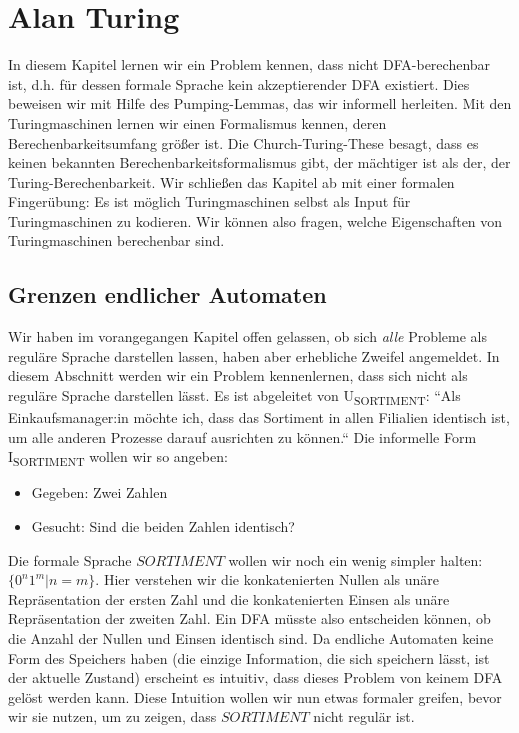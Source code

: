 \chapter{Alan Turing}\label{turing}

In diesem Kapitel lernen wir ein Problem kennen,
dass nicht DFA-berechenbar ist,
d.h. für dessen formale Sprache kein akzeptierender DFA existiert.
Dies beweisen wir mit Hilfe des Pumping-Lemmas,
das wir informell herleiten.
Mit den Turingmaschinen lernen wir einen Formalismus kennen,
deren Berechenbarkeitsumfang größer ist.
Die Church-Turing-These besagt,
dass es keinen bekannten Berechenbarkeitsformalismus gibt,
der mächtiger ist als der, der Turing-Berechenbarkeit.
Wir schließen das Kapitel ab mit einer formalen Fingerübung:
Es ist möglich Turingmaschinen selbst als Input für Turingmaschinen zu kodieren.
Wir können also fragen, welche Eigenschaften von Turingmaschinen berechenbar sind.

\section{Grenzen endlicher Automaten}\label{pumping}
Wir haben im vorangegangen Kapitel offen gelassen,
ob sich \emph{alle} Probleme als reguläre Sprache darstellen lassen,
haben aber erhebliche Zweifel angemeldet.
In diesem Abschnitt werden wir ein Problem kennenlernen,
dass sich nicht als reguläre Sprache darstellen lässt.
Es ist abgeleitet von U\textsubscript{SORTIMENT}:
``Als Einkaufsmanager:in möchte ich,
dass das Sortiment in allen Filialien identisch ist,
um alle anderen Prozesse darauf ausrichten zu können.``
Die informelle Form
I\textsubscript{SORTIMENT}
wollen wir so angeben:
\begin{itemize}
    \item Gegeben: Zwei Zahlen
    \item Gesucht: Sind die beiden Zahlen identisch?
\end{itemize}
Die formale Sprache $SORTIMENT$ wollen wir noch ein wenig simpler halten:
$\{0^n1^m|n=m\}$.
Hier verstehen wir die konkatenierten Nullen als unäre Repräsentation der ersten Zahl
und die konkatenierten Einsen als unäre Repräsentation der zweiten Zahl.
Ein DFA müsste also entscheiden können, ob die Anzahl der Nullen und Einsen identisch sind.
Da endliche Automaten keine Form des Speichers haben
(die einzige Information, die sich speichern lässt, ist der aktuelle Zustand)
erscheint es intuitiv, dass dieses Problem von keinem DFA gelöst werden kann.
Diese Intuition wollen wir nun etwas formaler greifen,
bevor wir sie nutzen, um zu zeigen, dass $SORTIMENT$ nicht regulär ist.

